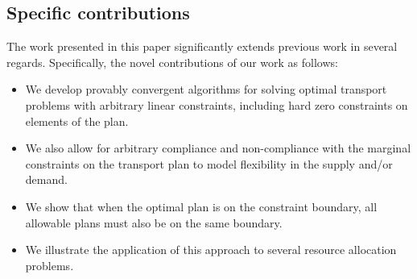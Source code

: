 \documentclass[twocolumn]{article}
\begin{document}
\subsection{Specific contributions}
The work presented in this paper significantly extends previous work in several regards. Specifically, the novel contributions of our work as follows:
\begin{itemize}
    \item We develop provably convergent algorithms for solving optimal transport problems with arbitrary linear constraints, including hard zero constraints on elements of the plan.
    \item We also allow for arbitrary compliance and non-compliance with the marginal constraints on the transport plan to model flexibility in the supply and/or demand.
    \item We show that when the optimal plan is on the constraint boundary, all allowable plans must also be on the same boundary.
    \item We illustrate the application of this approach to several resource allocation problems.
\end{itemize}
\end{document}
